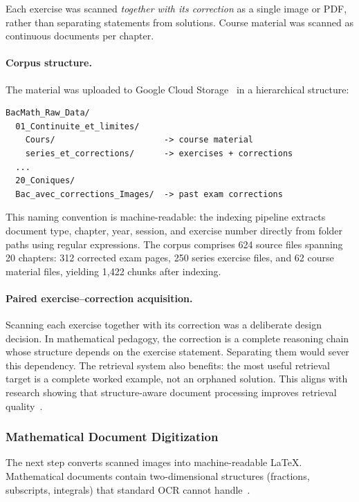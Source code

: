 Each exercise was scanned \textit{together with its correction} as a single
image or PDF, rather than separating statements from solutions. Course
material was scanned as continuous documents per chapter.

\paragraph{Corpus structure.}
The material was uploaded to Google Cloud Storage~\cite{gcloud_storage2024}
in a hierarchical structure:

\begin{verbatim}
BacMath_Raw_Data/
  01_Continuite_et_limites/
    Cours/                      -> course material
    series_et_corrections/      -> exercises + corrections
  ...
  20_Coniques/
  Bac_avec_corrections_Images/  -> past exam corrections
\end{verbatim}

This naming convention is machine-readable: the indexing pipeline extracts
document type, chapter, year, session, and exercise number directly from
folder paths using regular expressions. The corpus comprises 624 source
files spanning 20 chapters: 312 corrected exam pages, 250 series exercise
files, and 62 course material files, yielding 1{,}422 chunks after indexing.

\paragraph{Paired exercise--correction acquisition.}
Scanning each exercise together with its correction was a deliberate design
decision. In mathematical pedagogy, the correction is a complete reasoning
chain whose structure depends on the exercise statement. Separating them
would sever this dependency. The retrieval system also benefits: the most
useful retrieval target is a complete worked example, not an orphaned
solution. This aligns with research showing that structure-aware document
processing improves retrieval
quality~\cite{zhao2024financial_chunking, chen2024mog}.


\subsubsection{Mathematical Document Digitization}
\label{subsec:digitization}

The next step converts scanned images into machine-readable \LaTeX{}.
Mathematical documents contain two-dimensional structures (fractions,
subscripts, integrals) that standard OCR cannot
handle~\cite{wang2023ocrbench, mahdavi2019icdar_math}.

